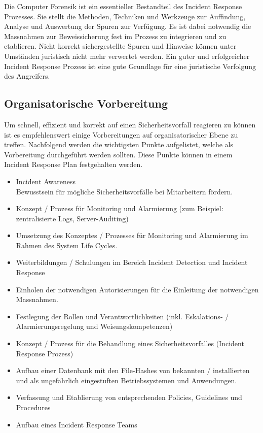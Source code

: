 Die Computer Forensik ist ein essentieller Bestandteil des Incident Response Prozesses. Sie stellt die Methoden, Techniken und Werkzeuge zur Auffindung, Analyse und Auswertung der Spuren zur Verfügung. Es ist dabei notwendig die Massnahmen zur Beweissicherung fest im Prozess zu integrieren und zu etablieren. Nicht korrekt sichergestellte Spuren und Hinweise können unter Umständen juristisch nicht mehr verwertet werden. Ein guter und erfolgreicher Incident Response Prozess ist eine gute Grundlage für eine juristische Verfolgung des Angreifers.

\subsection{Organisatorische Vorbereitung}
Um schnell, effizient und korrekt auf einen Sicherheitsvorfall reagieren zu können ist es empfehlenswert einige Vorbereitungen auf organisatorischer Ebene zu treffen.
Nachfolgend werden die wichtigsten Punkte aufgelistet, welche als Vorbereitung durchgeführt werden sollten. Diese Punkte können in einem Incident Response Plan festgehalten werden.

\begin{itemize}
\item Incident Awareness \\
Bewusstsein für mögliche Sicherheitsvorfälle bei Mitarbeitern fördern.
\item Konzept / Prozess für Monitoring und Alarmierung (zum Beispiel: zentralisierte Logs, Server-Auditing)
\item Umsetzung des Konzeptes / Prozesses für Monitoring und Alarmierung im Rahmen des System Life Cycles.
\item Weiterbildungen / Schulungen im Bereich Incident Detection und Incident Response
\item Einholen der notwendigen Autorisierungen für die Einleitung der notwendigen Massnahmen.
\item Festlegung der Rollen und Verantwortlichkeiten (inkl. Eskalations- / Alarmierungsregelung und Weisungskompetenzen)
\item Konzept / Prozess für die Behandlung eines Sicherheitsvorfalles (Incident Response Prozess)
\item Aufbau einer Datenbank mit den File-Hashes von bekannten / installierten und als ungefährlich eingestuften Betriebssystemen und Anwendungen.
\item Verfassung und Etablierung von entsprechenden Policies, Guidelines und Procedures
\item Aufbau eines Incident Response Teams
\end{itemize}

